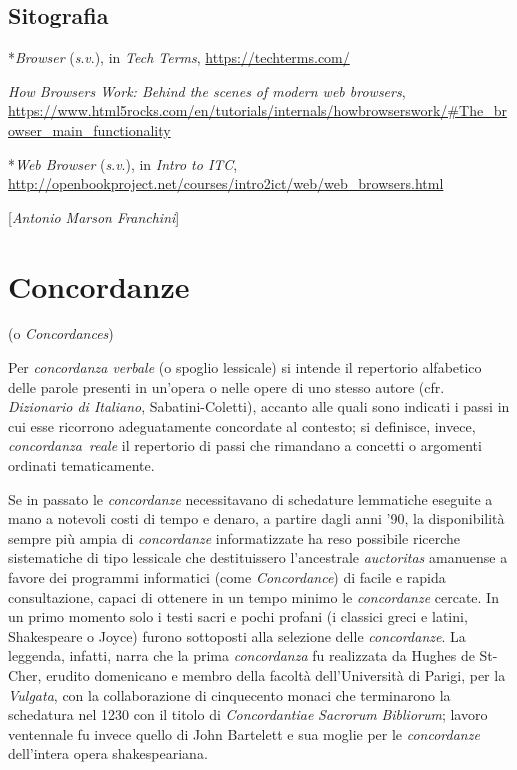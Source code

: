 \section*{Sitografia}
{\parindent0pt 
*\emph{Browser} (\emph{s}.\emph{v}.), in \emph{Tech Terms},
\url{https://techterms.com/}

\emph{How Browsers Work: Behind the scenes of modern web browsers},
\url{https://www.html5rocks.com/en/tutorials/internals/howbrowserswork/\#The_browser_main_functionality}

*\emph{Web Browser} (\emph{s}.\emph{v}.), in \emph{Intro to ITC},
\url{http://openbookproject.net/courses/intro2ict/web/web_browsers.html}

}

\hrulefill 

{[}\emph{Antonio Marson Franchini}{]}


\chapter{Concordanze }

(o \emph{Concordances})

Per \emph{concordanza verbale} (o spoglio lessicale) si intende il
repertorio alfabetico delle parole presenti in un'opera o nelle opere di
uno stesso autore (cfr. \emph{Dizionario di Italiano},
Sabatini-Coletti), accanto alle quali sono indicati i passi in cui esse
ricorrono adeguatamente concordate al contesto; si definisce, invece,
\emph{concordanza~reale} il repertorio di passi che rimandano a concetti
o argomenti ordinati tematicamente.

Se in passato le \emph{concordanze} necessitavano di schedature
lemmatiche eseguite a mano a notevoli costi di tempo e denaro, a partire
dagli anni '90, la disponibilità sempre più ampia di \emph{concordanze}
informatizzate ha reso possibile ricerche sistematiche di tipo lessicale
che destituissero l'ancestrale \emph{auctoritas} amanuense a favore dei
programmi informatici (come \emph{Concordance}) di facile e rapida
consultazione, capaci di ottenere in un tempo minimo le
\emph{concordanze} cercate. In un primo momento solo i testi sacri e
pochi profani (i classici greci e latini, Shakespeare o Joyce) furono
sottoposti alla selezione delle \emph{concordanze}. La leggenda,
infatti, narra che la prima \emph{concordanza} fu realizzata da Hughes
de St-Cher, erudito domenicano e membro della facoltà dell'Università di
Parigi, per la \emph{Vulgata}, con la collaborazione di cinquecento
monaci che terminarono la schedatura nel 1230 con il titolo di
\emph{Concordantiae} \emph{Sacrorum} \emph{Bibliorum}; lavoro ventennale
fu invece quello di John Bartelett e sua moglie per le
\emph{concordanze} dell'intera opera shakespeariana.

